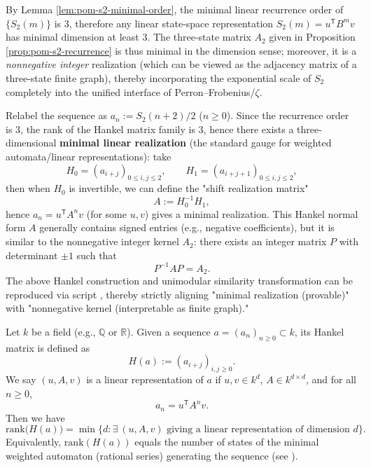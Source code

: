 \begin{remark}\label{rem:pom-s2-minimal-realization}
By Lemma \ref{lem:pom-s2-minimal-order}, the minimal linear recurrence order of \(\{S_2(m)\}\) is \(3\), therefore any linear state-space representation \(S_2(m)=u^{\mathsf T}B^{m}v\) has minimal dimension at least \(3\). The three-state matrix \(A_2\) given in Proposition \ref{prop:pom-s2-recurrence} is thus minimal in the dimension sense; moreover, it is a\emph{ nonnegative integer} realization (which can be viewed as the adjacency matrix of a three-state finite graph), thereby incorporating the exponential scale of \(S_2\) completely into the unified interface of Perron--Frobenius/\(\zeta\).
\end{remark}

\begin{remark}\label{rem:pom-s2-hankel}
Relabel the sequence as \(a_n:=S_2(n+2)/2\) (\(n\ge 0\)). Since the recurrence order is \(3\), the rank of the Hankel matrix family is \(3\), hence there exists a three-dimensional\textbf{ minimal linear realization} (the standard gauge for weighted automata/linear representations): take
$$
H_0=(a_{i+j})_{0\le i,j\le 2},\qquad H_1=(a_{i+j+1})_{0\le i,j\le 2},
$$
then when \(H_0\) is invertible, we can define the "shift realization matrix"
$$
A:=H_0^{-1}H_1,
$$
hence \(a_n=u^{\mathsf T}A^{n}v\) (for some \(u,v\)) gives a minimal realization. This Hankel normal form \(A\) generally contains signed entries (e.g., negative coefficients), but it is similar to the nonnegative integer kernel \(A_2\): there exists an integer matrix \(P\) with determinant \(\pm 1\) such that
$$
P^{-1}AP=A_2.
$$
The above Hankel construction and unimodular similarity transformation can be reproduced via script , thereby strictly aligning "minimal realization (provable)" with "nonnegative kernel (interpretable as finite graph)."
\end{remark}

\begin{theorem}\label{thm:hankel-rank-minimal}
Let \(k\) be a field (e.g., \(\mathbb{Q}\) or \(\mathbb{R}\)). Given a sequence \(a=(a_n)_{n\ge 0}\subset k\), its Hankel matrix is defined as
$$
H(a):=(a_{i+j})_{i,j\ge 0}.
$$
We say \((u,A,v)\) is a linear representation of \(a\) if \(u,v\in k^d\), \(A\in k^{d\times d}\), and for all \(n\ge 0\),
$$
a_n=u^{\mathsf T}A^n v.
$$
Then we have
$$
\mathrm{rank}\bigl(H(a)\bigr)=\min\{d:\exists\ (u,A,v)\text{ giving a linear representation of dimension }d\}.
$$
Equivalently, \(\mathrm{rank}(H(a))\) equals the number of states of the minimal weighted automaton (rational series) generating the sequence (see \cite{BerstelReutenauer1988RationalSeries}).
\end{theorem}

